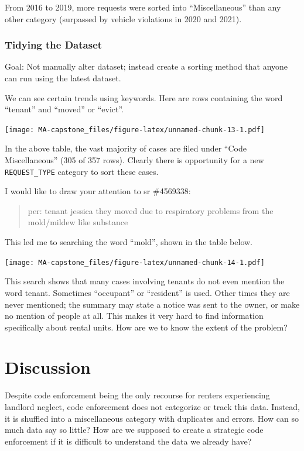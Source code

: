 \documentclass[
]{book}
\begin{document}
From 2016 to 2019, more requests were sorted into ``Miscellaneous'' than any other category (surpassed by vehicle violations in 2020 and 2021).

\hypertarget{tidying-the-dataset}{%
\subsection{Tidying the Dataset}\label{tidying-the-dataset}}

Goal: Not manually alter dataset; instead create a sorting method that anyone can run using the latest dataset.

We can see certain trends using keywords. Here are rows containing the word ``tenant'' and ``moved'' or ``evict''.

\texttt{[image: MA-capstone\_files/figure-latex/unnamed-chunk-13-1.pdf]}

In the above table, the vast majority of cases are filed under ``Code Miscellaneous'' (305 of 357 rows). Clearly there is opportunity for a new \texttt{REQUEST\_TYPE} category to sort these cases.

I would like to draw your attention to sr \#4569338:

\begin{quote}
per: tenant jessica they moved due to respiratory problems from the mold/mildew like substance
\end{quote}

This led me to searching the word ``mold'', shown in the table below.

\texttt{[image: MA-capstone\_files/figure-latex/unnamed-chunk-14-1.pdf]}

This search shows that many cases involving tenants do not even mention the word tenant. Sometimes ``occupant'' or ``resident'' is used. Other times they are never mentioned; the summary may state a notice was sent to the owner, or make no mention of people at all. This makes it very hard to find information specifically about rental units. How are we to know the extent of the problem?

\hypertarget{discussion}{%
\chapter{Discussion}\label{discussion}}

Despite code enforcement being the only recourse for renters experiencing landlord neglect, code enforcement does not categorize or track this data. Instead, it is shuffled into a miscellaneous category with duplicates and errors. How can so much data say so little? How are we supposed to create a strategic code enforcement if it is difficult to understand the data we already have?
\end{document}
